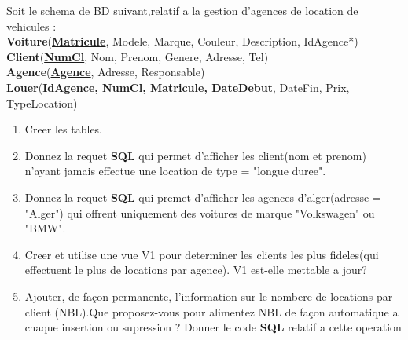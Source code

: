 Soit le schema de BD suivant,relatif a la gestion d'agences de location de vehicules :\\[0.15cm]
\textbf{Voiture}(\textbf{\underline{Matricule}}, Modele, Marque, Couleur, Description, IdAgence*)\\[0.1cm]
\textbf{Client}(\textbf{\underline{NumCl}}, Nom, Prenom, Genere, Adresse, Tel)\\[0.1cm]
\textbf{Agence}(\textbf{\underline{Agence}}, Adresse, Responsable)\\[0.1cm]
\textbf{Louer}(\textbf{\underline{IdAgence, NumCl, Matricule, DateDebut}}, DateFin, Prix, TypeLocation)\\[0.1cm]

\begin{enumerate}
    \item Creer les tables.
    \item Donnez la requet \textbf{SQL} qui permet d'afficher les client(nom et prenom) n'ayant jamais effectue une location de type = "longue duree".
    \item Donnez la requet \textbf{SQL} qui premet d'afficher les agences d'alger(adresse = "Alger") qui offrent uniquement des voitures de marque "Volkswagen" ou "BMW".
    \item Creer et utilise une vue V1 pour determiner les clients les plus fideles(qui effectuent le plus de locations par agence). V1 est-elle mettable a jour?
    \item Ajouter, de fa\c{c}on permanente, l'information sur le nombere de locations par client (NBL).Que proposez-vous pour alimentez NBL de fa\c{c}on automatique a chaque
insertion ou supression ? Donner le code \textbf{SQL} relatif a cette operation
\end{enumerate}
